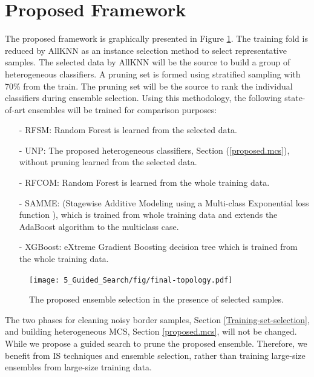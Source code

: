 %
%
\section{Proposed Framework}
\label{ch5_methodology}

The proposed framework is graphically presented in Figure \ref{topology}. The training fold is reduced by AllKNN \cite{tomek1976} as an instance selection method to select representative samples. The selected data by AllKNN will be the source to build a group of heterogeneous classifiers. A pruning set is formed using stratified sampling with 70\% from the train. The pruning set will be the source to rank the individual classifiers during ensemble selection. Using this methodology, the following state-of-art ensembles will be trained for comparison purposes:

\begin{itemize}[nosep]
   \item[-] RFSM: Random Forest \cite{breiman2001} is learned from the selected data.
   \item[-] UNP: The proposed heterogeneous classifiers, Section (\ref{proposed.mcs}), without pruning  learned from the selected data.
   \item[-] RFCOM: Random Forest is learned from the whole training data.
   \item[-] SAMME: (Stagewise Additive Modeling
using a Multi-class Exponential loss function \cite{hastie2009}), which is trained from whole training data and extends the AdaBoost algorithm to the multiclass case.
\item[-] XGBoost: eXtreme Gradient Boosting decision tree \citep{chen2016} which is trained from the whole training data.
\vspace*{.3cm}

\end{itemize}
  \begin{figure}[!ht]
\centering
\texttt{[image: 5\_Guided\_Search/fig/final-topology.pdf]}
\caption{ The proposed ensemble selection in the presence of selected samples.}
\label{topology}
\end{figure}


The two phases for cleaning noisy border samples, Section \ref{Training-set-selection}, and building heterogeneous MCS, Section \ref{proposed.mcs}, will not be changed. While we propose a guided search to prune the proposed ensemble. Therefore, we benefit from IS techniques and ensemble selection, rather than training large-size ensembles from large-size training data. 
   



